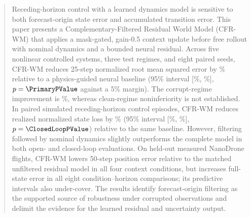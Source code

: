 \begin{abstract}
Receding-horizon control with a learned dynamics model is sensitive to both
forecast-origin state error and accumulated transition error. This paper
presents a Complementary-Filtered Residual World Model (CFR-WM) that applies a
mask-gated, gain-0.5 context update before free rollout with nominal dynamics
and a bounded neural residual. Across five nonlinear controlled systems, three
test regimes, and eight paired seeds, CFR-WM reduces 25-step normalized root
mean squared error by \PrimaryImprovement\% relative to a physics-guided neural
baseline (95\% interval [\PrimaryRelativeCILow\%,
\PrimaryRelativeCIHigh\%], $p=\PrimaryPValue$ against a 5\% margin). The
corrupt-regime improvement is \CorruptImprovement\%, whereas clean-regime
noninferiority is not established. In \ClosedLoopEpisodes{} paired simulated
receding-horizon control episodes, CFR-WM reduces realized normalized state
loss by \ClosedLoopImprovement\% (95\% interval [\ClosedLoopCILow\%,
\ClosedLoopCIHigh\%], $p=\ClosedLoopPValue$) relative to the same baseline.
However, filtering followed by nominal dynamics slightly outperforms the
complete model in both open- and closed-loop evaluations. On held-out measured
NanoDrone flights, CFR-WM lowers 50-step position error relative to the matched
unfiltered residual model in all four context conditions, but increases
full-state error in all eight condition--horizon comparisons; its predictive
intervals also under-cover. The results identify forecast-origin filtering as
the supported source of robustness under corrupted observations and delimit
the evidence for the learned residual and uncertainty output.
\end{abstract}
